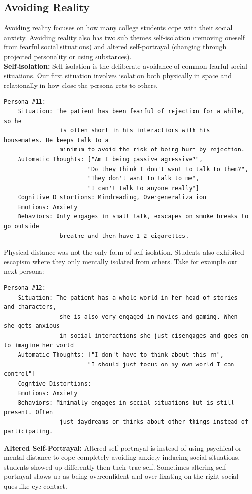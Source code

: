 \documentclass[twoside]{report}
\begin{document}
\subsection{Avoiding Reality}
Avoiding reality focuses on how many college students cope with their social anxiety. Avoiding reality also has two sub themes self-isolation (removing oneself from fearful social situations) and altered self-portrayal (changing through projected personality or using substances). \\

\textbf{Self-isolation:} Self-isolation is the deliberate avoidance of common fearful social situations. Our first situation involves isolation both physically in space and relationally in how close the persona gets to others.
\begin{verbatim}
Persona #11:
    Situation: The patient has been fearful of rejection for a while, so he 
                is often short in his interactions with his housemates. He keeps talk to a 
                minimum to avoid the risk of being hurt by rejection.
    Automatic Thoughts: ["Am I being passive agressive?",
                        "Do they think I don't want to talk to them?",
                        "They don't want to talk to me",
                        "I can't talk to anyone really"]
    Cognitive Distortions: Mindreading, Overgeneralization
    Emotions: Anxiety
    Behaviors: Only engages in small talk, exscapes on smoke breaks to go outside
                breathe and then have 1-2 cigarettes.
\end{verbatim}
Physical distance was not the only form of self isolation. Students also exhibited escapism where they only mentally isolated from others. Take for example our next persona:
\begin{verbatim}
Persona #12:
    Situation: The patient has a whole world in her head of stories and characters,
                she is also very engaged in movies and gaming. When she gets anxious 
                in social interactions she just disengages and goes on to imagine her world
    Automatic Thoughts: ["I don't have to think about this rn",
                        "I should just focus on my own world I can control"]
    Cogntive Distortions: 
    Emotions: Anxiety
    Behaviors: Minimally engages in social situations but is still present. Often
                just daydreams or thinks about other things instead of participating. 
\end{verbatim}

\textbf{Altered Self-Portrayal:} Altered self-portrayal is instead of using psychical or mental distance to cope completely avoiding anxiety inducing social situations, students showed up differently then their true self. Sometimes altering self-portrayal shows up as being overconfident and over fixating on the right social ques like eye contact.
\end{document}
